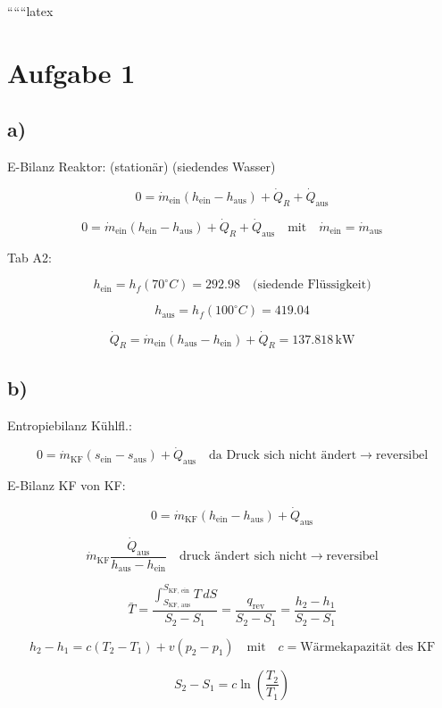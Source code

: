 
``````latex


\section*{Aufgabe 1}

\subsection*{a)}

E-Bilanz Reaktor: (stationär) (siedendes Wasser)

\[
0 = \dot{m}_{\text{ein}} (h_{\text{ein}} - h_{\text{aus}}) + \dot{Q}_R + \dot{Q}_{\text{aus}}
\]

\[
0 = \dot{m}_{\text{ein}} (h_{\text{ein}} - h_{\text{aus}}) + \dot{Q}_R + \dot{Q}_{\text{aus}} \quad \text{mit} \quad \dot{m}_{\text{ein}} = \dot{m}_{\text{aus}}
\]

Tab A2:

\[
h_{\text{ein}} = h_f (70^\circ C) = 292.98 \quad \text{(siedende Flüssigkeit)}
\]

\[
h_{\text{aus}} = h_f (100^\circ C) = 419.04
\]

\[
\dot{Q}_R = \dot{m}_{\text{ein}} (h_{\text{aus}} - h_{\text{ein}}) + \dot{Q}_R = 137.818 \, \text{kW}
\]

\subsection*{b)}

Entropiebilanz Kühlfl.:

\[
0 = \dot{m}_{\text{KF}} (s_{\text{ein}} - s_{\text{aus}}) + \dot{Q}_{\text{aus}} \quad \text{da Druck sich nicht ändert} \rightarrow \text{reversibel}
\]

E-Bilanz KF von KF:

\[
0 = \dot{m}_{\text{KF}} (h_{\text{ein}} - h_{\text{aus}}) + \dot{Q}_{\text{aus}}
\]

\[
\dot{m}_{\text{KF}} \frac{\dot{Q}_{\text{aus}}}{h_{\text{aus}} - h_{\text{ein}}} \quad \text{druck ändert sich nicht} \rightarrow \text{reversibel}
\]

\[
\bar{T} = \frac{\int_{S_{\text{KF, aus}}}^{S_{\text{KF, ein}}} T \, dS}{S_2 - S_1} = \frac{q_{\text{rev}}}{S_2 - S_1} = \frac{h_2 - h_1}{S_2 - S_1}
\]

\[
h_2 - h_1 = c (T_2 - T_1) + v (p_2 - p_1) \quad \text{mit} \quad c = \text{Wärmekapazität des KF}
\]

\[
S_2 - S_1 = c \ln \left( \frac{T_2}{T_1} \right)
\]

